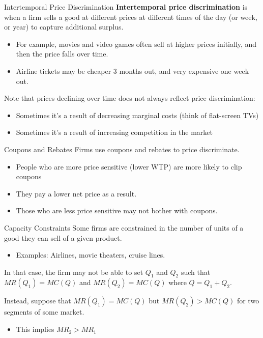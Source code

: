 \documentclass[11pt,t]{beamer}
\begin{document}
\begin{frame}{Intertemporal Price Discrimination}
  \textbf{Intertemporal price discrimination} is when a firm sells a good at different prices at different times of the day (or week, or year) to capture additional surplus.

  \begin{itemize}
    \item For example, movies and video games often sell at higher prices initially, and then the price falls over time.
    
    \item Airline tickets may be cheaper 3 months out, and very expensive one week out.    
  \end{itemize}
  
  \bigskip
  Note that prices declining over time does not always reflect price discrimination:
  \begin{itemize}
    \item Sometimes it's a result of decreasing marginal costs (think of flat-screen TVs)
    \item Sometimes it's a result of increasing competition in the market
  \end{itemize}
\end{frame}

\begin{frame}{Coupons and Rebates}
  Firms use coupons and rebates to price discriminate.

  \begin{itemize}
    \item People who are more price sensitive (lower WTP) are more likely to clip coupons
    \item They pay a lower net price as a result.
    \item Those who are less price sensitive may not bother with coupons.
  \end{itemize}
\end{frame}

\begin{frame}{Capacity Constraints}
  Some firms are constrained in the number of units of a good they can sell of a given product.

  \begin{itemize}
    \item Examples: Airlines, movie theaters, cruise lines.
  \end{itemize}

  \bigskip\pause 
  In that case, the firm may not be able to set $Q_1$ and $Q_2$ such that $MR(Q_1) = MC(Q)$ and $MR(Q_2) = MC(Q)$ where $Q = Q_1 + Q_2$.
  
  \bigskip
  Instead, suppose that $MR(Q_1) = MC(Q)$ but $MR(Q_2) > MC(Q)$ for two segments of some market.
  \begin{itemize}
    \item This implies $MR_2 > MR_1$
  \end{itemize}
\end{frame}
\end{document}

